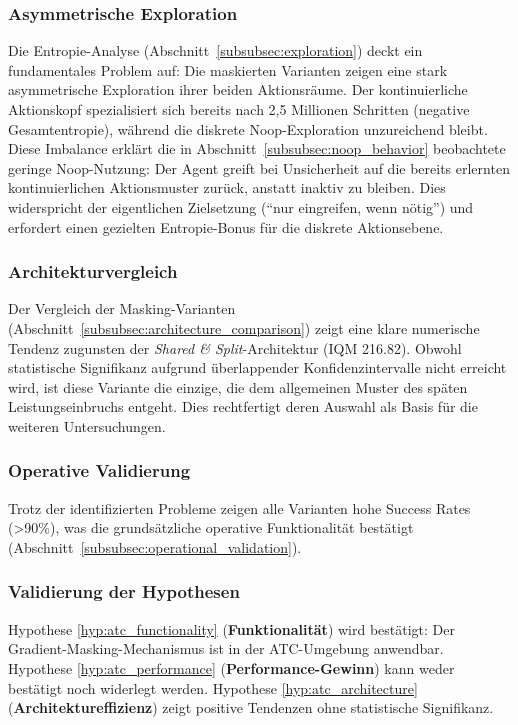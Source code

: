 \subsubsection*{Asymmetrische Exploration}
Die Entropie-Analyse (Abschnitt~\ref{subsubsec:exploration}) deckt ein fundamentales Problem auf: Die maskierten Varianten zeigen eine stark asymmetrische Exploration ihrer beiden Aktionsräume. Der kontinuierliche Aktionskopf spezialisiert sich bereits nach 2,5 Millionen Schritten (negative Gesamtentropie), während die diskrete Noop-Exploration unzureichend bleibt. Diese Imbalance erklärt die in Abschnitt~\ref{subsubsec:noop_behavior} beobachtete geringe Noop-Nutzung: Der Agent greift bei Unsicherheit auf die bereits erlernten kontinuierlichen Aktionsmuster zurück, anstatt inaktiv zu bleiben. Dies widerspricht der eigentlichen Zielsetzung (\enquote{nur eingreifen, wenn nötig}) und erfordert einen gezielten Entropie-Bonus für die diskrete Aktionsebene.

\subsubsection*{Architekturvergleich}
Der Vergleich der Masking-Varianten (Abschnitt~\ref{subsubsec:architecture_comparison}) zeigt eine klare numerische Tendenz zugunsten der \emph{Shared \& Split}-Architektur (\ac{IQM} 216.82). Obwohl statistische Signifikanz aufgrund überlappender Konfidenzintervalle nicht erreicht wird, ist diese Variante die einzige, die dem allgemeinen Muster des späten Leistungseinbruchs entgeht. Dies rechtfertigt deren Auswahl als Basis für die weiteren Untersuchungen.

\subsubsection*{Operative Validierung}
Trotz der identifizierten Probleme zeigen alle Varianten hohe Success Rates (>90\%), was die grundsätzliche operative Funktionalität bestätigt (Abschnitt~\ref{subsubsec:operational_validation}).

\subsubsection*{Validierung der Hypothesen}
Hypothese \ref{hyp:atc_functionality} (\textbf{Funktionalität}) wird bestätigt: Der Gradient\hyp{}Masking\hyp{}Mechanismus ist in der ATC-Umgebung anwendbar. Hypothese \ref{hyp:atc_performance} (\textbf{Performance-Gewinn}) kann weder bestätigt noch widerlegt werden. Hypothese \ref{hyp:atc_architecture} (\textbf{Archi\-tek\-tur\-effi\-zi\-enz}) zeigt positive Tendenzen ohne statistische Signifikanz.

